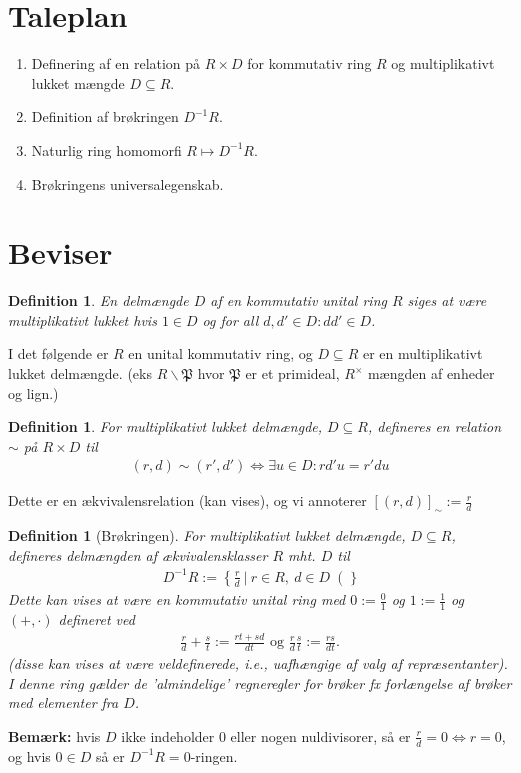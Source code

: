 \documentclass[10pt,twoside,openany,final]{memoir}
\theoremstyle{break}
\newtheorem{definition}[section]{Definition}
\theoremstyle{Break}
\begin{document}
\section*{Taleplan}
\begin{enumerate}
\item Definering af en relation på $R \times D$ for kommutativ ring $R$ og multiplikativt lukket mængde $D \subseteq R$.
\item Definition af brøkringen $D^{-1}R$.
\item Naturlig ring homomorfi $R \mapsto D^{-1}R$.
\item Brøkringens universalegenskab.
\end{enumerate}
\section*{Beviser}
\begin{definition}
En delmængde $D$ af en kommutativ unital ring $R$ siges at være multiplikativt lukket hvis $1 \in D$ og for all $d,d' \in D: dd' \in D$.
\end{definition}
I det følgende er $R$ en unital kommutativ ring, og $D \subseteq R$ er en multiplikativt lukket delmængde. (eks $R\backslash \mathfrak{P} $ hvor $\mathfrak{P}$ er et primideal, $R^{\times}$ mængden af enheder og lign.)
\begin{definition}
For multiplikativt lukket delmængde, $D \subseteq R$, defineres en relation $\sim$ på $R \times D$ til \begin{align*}
(r,d) \sim (r',d') \iff \exists u \in D : rd'u=r'du
\end{align*}
\end{definition}
\noindent Dette er en ækvivalensrelation (kan vises), og vi annoterer $[(r,d)]_{\sim}:=\frac{r}{d}$
\begin{definition}[Brøkringen]
For multiplikativt lukket delmængde, $D \subseteq R$, defineres delmængden af ækvivalensklasser $R$ mht. $D$ til
\begin{align*}
D^{-1}R:=\left\{ \frac{r}{d}\  |\  r \in R ,\ d \in D \right(\}
\end{align*}
Dette kan vises at være en kommutativ unital ring med $0:=\frac{0}{1}$ og $1:= \frac{1}{1}$ og $(+,\cdot)$ defineret ved
\begin{align*}
\frac{r}{d}+\frac{s}{t}:=\frac{rt+sd}{dt} \text{  og  } \frac{r}{d} \frac{s}{t}:=\frac{rs}{dt}.
\end{align*} (disse kan vises at være veldefinerede, i.e., uafhængige af valg af repræsentanter). I denne ring gælder de 'almindelige' regneregler for brøker fx forlængelse af brøker med elementer fra $D$.
\end{definition}
\noindent \textbf{Bemærk:} hvis $D$ ikke indeholder $0$ eller nogen nuldivisorer, så er $\frac{r}{d}=0  \iff r=0$, og hvis $0 \in D$ så er $D^{-1}R=0$-ringen.
\end{document}
